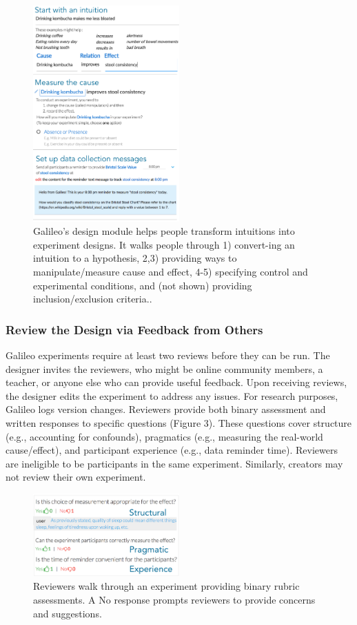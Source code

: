 \begin{figure}[h] 
  \centering
  \includegraphics[width=0.5\textwidth]{figures/galileo/galileo-2-design}
  \caption[]
{Galileo’s design module helps people transform intuitions into experiment designs. It walks people through 1) convert-ing an intuition to a hypothesis, 2,3) providing ways to manipulate/measure cause and effect, 4-5) specifying control and experimental conditions, and (not shown) providing inclusion/exclusion criteria..}
  \label{fig:galileo-2}
\end{figure}

\subsubsection{Review the Design via Feedback from Others}
Galileo experiments require at least two reviews before they can be run. The designer invites the reviewers, who might be online community members, a teacher, or anyone else who can provide useful feedback. Upon receiving reviews, the designer edits the experiment to address any issues. For research purposes, Galileo logs version changes. Reviewers provide both binary assessment and written responses to specific questions (Figure 3). These questions cover structure (e.g., accounting for confounds), pragmatics (e.g., measuring the real-world cause/effect), and participant experience (e.g., data reminder time). Reviewers are ineligible to be participants in the same experiment. Similarly, creators may not review their own experiment. 

\begin{figure}[h] 
  \centering
  \includegraphics[width=0.5\textwidth]{figures/galileo/galileo-2-review}
  \caption[]
{Reviewers walk through an experiment providing binary rubric assessments. A No response prompts reviewers to provide concerns and suggestions.}
  \label{fig:galileo-2-review}
\end{figure}

